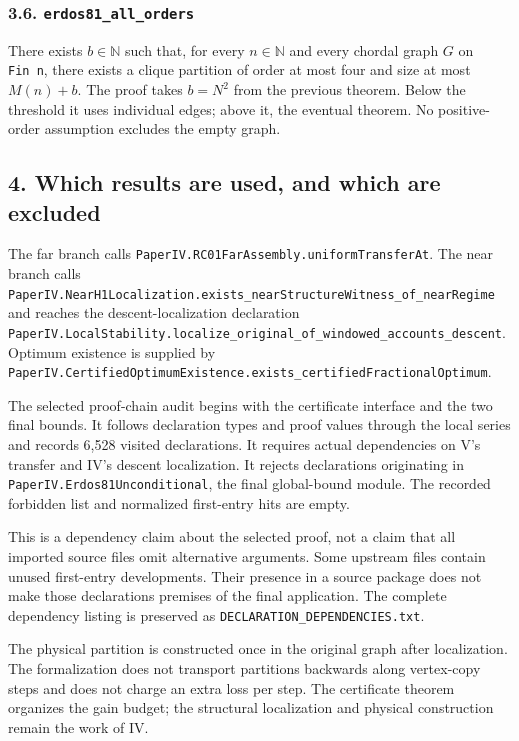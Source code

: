 \documentclass[english,11pt,a4paper]{article}
\begin{document}
\subsubsection{\texorpdfstring{3.6.
\nolinkurl{erdos81_all_orders}}{3.6. erdos81\_all\_orders}}\label{erdos81_all_orders}

There exists \(b\in\mathbb N\) such that, for every \(n\in\mathbb N\)
and every chordal graph \(G\) on \texttt{Fin\ n}, there exists a clique
partition of order at most four and size at most \(M(n)+b\). The proof
takes \(b=N^2\) from the previous theorem. Below the threshold it uses
individual edges; above it, the eventual theorem. No positive-order
assumption excludes the empty graph.

\subsection{4. Which results are used, and which are
excluded}\label{which-results-are-used-and-which-are-excluded}

The far branch calls \nolinkurl{PaperIV.RC01FarAssembly.uniformTransferAt}.
The near branch calls
\nolinkurl{PaperIV.NearH1Localization.exists_nearStructureWitness_of_nearRegime}
and reaches the descent-localization declaration
\nolinkurl{PaperIV.LocalStability.localize_original_of_windowed_accounts_descent}.
Optimum existence is supplied by
\nolinkurl{PaperIV.CertifiedOptimumExistence.exists_certifiedFractionalOptimum}.

The selected proof-chain audit begins with the certificate interface and
the two final bounds. It follows declaration types and proof values
through the local series and records 6,528 visited declarations. It
requires actual dependencies on V's transfer and IV's descent
localization. It rejects declarations originating in
\nolinkurl{PaperIV.Erdos81Unconditional}, the final global-bound module.
The recorded forbidden list and normalized first-entry hits are empty.

This is a dependency claim about the selected proof, not a claim that
all imported source files omit alternative arguments. Some upstream
files contain unused first-entry developments. Their presence in a
source package does not make those declarations premises of the final
application. The complete dependency listing is preserved as
\nolinkurl{DECLARATION_DEPENDENCIES.txt}.

The physical partition is constructed once in the original graph after
localization. The formalization does not transport partitions backwards
along vertex-copy steps and does not charge an extra loss per step. The
certificate theorem organizes the gain budget; the structural
localization and physical construction remain the work of IV.
\end{document}
